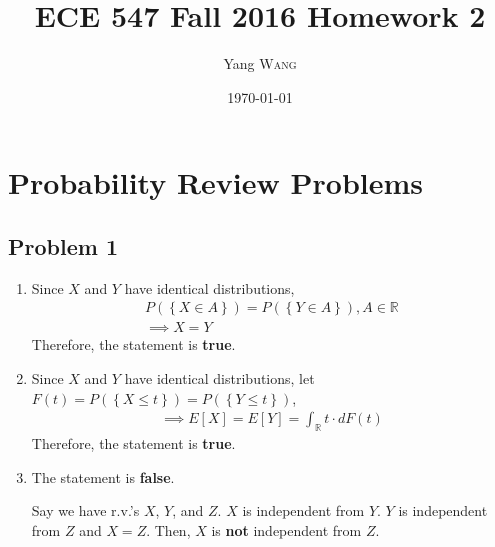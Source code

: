 \documentclass{article}
\title{ECE 547 Fall 2016 Homework 2} %
\author{Yang \textsc{Wang}}  %
\date{\today} %
\begin{document}
\maketitle %


\section*{Probability Review Problems}
	\subsection*{Problem 1}
		\begin{enumerate}
			\item Since $X$ and $Y$ have identical distributions,
				\begin{gather*}
					P(\left\{X \in A\right\}) = P(\left\{Y \in A\right\}), A \in \mathbb{R} \\
					\implies X = Y
				\end{gather*}
				Therefore, the statement is \textbf{true}.
			\item Since $X$ and $Y$ have identical distributions,
				let $F(t) = P(\left\{X \leq t\right\}) = P(\left\{Y \leq t\right\})$,
				\begin{gather*}
					\implies E[X] = E[Y] = \int_{\mathbb{R}}^{}t \cdot dF(t)
				\end{gather*}
				Therefore, the statement is \textbf{true}.
			\item The statement is \textbf{false}.
				
				Say we have r.v.'s $X$, $Y$, and
				$Z$. $X$ is independent from $Y$. $Y$ is independent from $Z$ and $X = Z$.
				Then, $X$ is \textbf{not} independent from $Z$.
		\end{enumerate}
\end{document}
